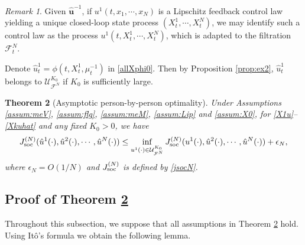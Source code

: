 \documentclass{amsart}
\newtheorem{theorem}{Theorem}[section]
\theoremstyle{definition}
\theoremstyle{remark}
\newtheorem{remark}[theorem]{Remark}
\def\cal{\mathcal}
\numberwithin{equation}{section}
\begin{document}
\begin{remark}
Given $\hat {\mathbf u}^{-1}$,
if $u^1(t, x_1, \cdots, x_N)$ is a Lipschitz feedback control law yielding  a unique closed-loop state process $(X_t^1, \cdots, X_t^N)$, we may identify such a control law as the process $u^1(t, X_t^1, \cdots, X_t^N)$, which is adapted to the filtration ${\mathcal F}_t^N$.
\end{remark}

Denote $\hat u_t^1= \phi(t, X_t^1, \mu_t^{-1})$ in \eqref{allXphi0}. Then by Proposition \ref{prop:ex2}, $\hat u_t^1$ belongs to $ {\cal U}_{\cal F^N}^{K_0}$ if $K_0$ is sufficiently large.

\begin{theorem}[Asymptotic person-by-person optimality]
\label{theorem:pbpo}
 Under Assumptions \ref{assum:meV}, \ref{assum:flg}, \ref{assum:meM}, \ref{assum:Lip}   and \ref{assum:X0}, for \eqref{X1u}--\eqref{Xkuhat} and any fixed $K_0>0$, we have
$$
J^{(N)}_{\rm soc} (\hat u^1(\cdot) , \hat u^2(\cdot), \cdots, \hat u^N(\cdot))\le  \inf_{u^1(\cdot)\in {\cal U}_{\cal F^N}^{K_0}}J^{(N)}_{\rm soc} (u^1(\cdot) , \hat u^2(\cdot), \cdots, \hat u^N(\cdot))+\epsilon_N,
$$
where $\epsilon_N =O(1/N)$ and $J^{(N)}_{\rm soc}$ is defined by \eqref{jsocN}.
\end{theorem}



\subsection{Proof of Theorem \ref{theorem:pbpo}}
Throughout this subsection, we suppose that all assumptions in Theorem \ref{theorem:pbpo} hold.
Using It\^o's formula
we obtain the following lemma.
\end{document}
